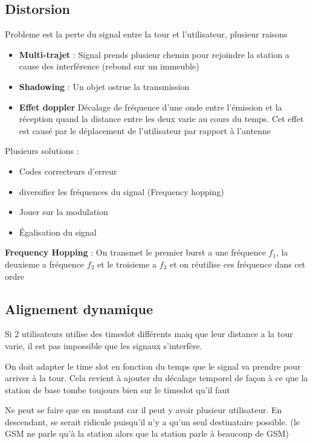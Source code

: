 \documentclass[12pt]{article}
\begin{document}
 	\subsection{Distorsion}
 		Probleme est la perte du signal entre la tour et l'utilisateur, plusieur raisons
 		\begin{itemize}
 			\item \textbf{Multi-trajet} : Signal prends plusieur chemin pour rejoindre la station a cause des interférence (rebond sur un immeuble)
 			\item \textbf{Shadowing} : Un objet ostrue la transmission
 			\item \textbf{Effet doppler} Décalage de fréquence d’une onde entre l’émission et la réception quand la distance entre les deux varie au cours du temps. Cet effet est causé par le déplacement de l’utilisateur par rapport à l’antenne
 		\end{itemize}
 		
 		Plusieurs solutions :
 		\begin{itemize}
 			\item Codes correcteurs d'erreur
 			\item diversifier les fréquences du signal (Frequency hopping)
 			\item Jouer sur la modulation
 			\item Égalisation du signal
 		\end{itemize}
 		
 		\textbf{Frequency Hopping} : On transmet le premier burst a une fréquence $f_1$, la deuxieme a fréquence $f_2$ et le troisieme a $f_3$ et on réutilise ces fréquence dans cet ordre
 		
 		
 	\subsection{Alignement dynamique}
 		Si 2 utilisateurs utilise des timeslot différents maiq que leur distance a la tour varie, il est pas impossible que les signaux s'interfère.
 		
 		On doit adapter le time slot en fonction du temps que le signal va prendre pour arriver à la tour. Cela revient à ajouter du décalage temporel de façon à ce que la station de base tombe toujours bien sur le timeslot qu’il faut
 		
 		Ne peut se faire que en montant car il peut y avoir plusieur utilisateur. En descendant,  se serait ridicule puisqu’il n’y a qu’un seul destinataire possible. (le GSM ne parle qu’à la station alors que la station parle à beaucoup de GSM)
 		
\end{document}
